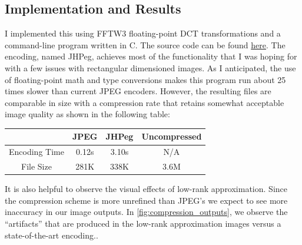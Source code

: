 \documentclass[12pt,technote]{IEEEtran}
\begin{document}
\subsection{Implementation and Results}
I implemented this using FFTW3 floating-point DCT transformations and a command-line program written in C. The source code can be found \href{https://github.com/henry-2025/math189-spectral-compression}{here}. The encoding, named JHPeg, achieves most of the functionality that I was hoping for with a few issues with rectangular dimensioned images. As I anticipated, the use of floating-point math and type conversions makes this program run about 25 times slower than current JPEG encoders. However, the resulting files are comparable in size with a compression rate that retains somewhat acceptable image quality as shown in the following table:
\begin{center}
    \begin{tabular}{c|c c c}
        & JPEG & JHPeg & Uncompressed\\
        \hline
        Encoding Time & 0.12s & 3.10s & N/A\\
        File Size & 281K & 338K & 3.6M
    \end{tabular}
\end{center}
It is also helpful to observe the visual effects of low-rank approximation. Since the compression scheme is more unrefined than JPEG's we expect to see more inaccuracy in our image outputs. In \ref{fig:compression_outputs}, we observe the ``artifacts'' that are produced in the low-rank approximation images versus a state-of-the-art encoding..
\end{document}

